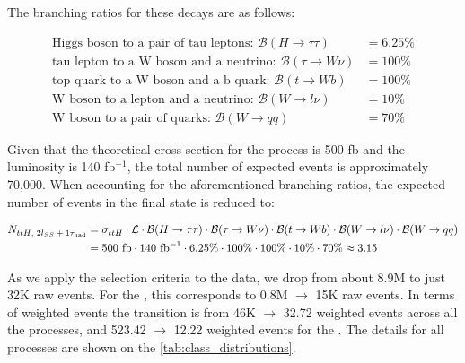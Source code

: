 The branching ratios for these decays are as follows:

\begin{align*}
    \text{Higgs boson to a pair of tau leptons: }\mathcal{B}(H \rightarrow \tau\tau)  & = 6.25\% \\
    \text{tau lepton to a W boson and a neutrino: }\mathcal{B}(\tau \rightarrow W\nu) & = 100\%  \\
    \text{top quark to a W boson and a b quark: }\mathcal{B}(t \rightarrow Wb)        & = 100\%  \\
    \text{W boson to a lepton and a neutrino: }\mathcal{B}(W \rightarrow l\nu)        & = 10\%   \\
    \text{W boson to a pair of quarks: }\mathcal{B}(W \rightarrow qq)                 & = 70\%
\end{align*}

Given that the theoretical cross-section for the \tth process is 500 fb and the luminosity is 140 fb$^{-1}$, the total
number of expected \tth events is approximately 70,000. When accounting for the aforementioned branching ratios, the
expected number of \tth events in the \lss final state is reduced to:

\begin{align*}
    N_{\text{\ensuremath{{t\bar{t}H}}, \ensuremath{2l_{SS}+1\tau_\text{had}}}} & = \sigma_{\text{\ensuremath{{t\bar{t}H}}}} \cdot \mathcal{L} \cdot \mathcal{B}(H \rightarrow \tau\tau) \cdot \mathcal{B}(\tau \rightarrow W\nu) \cdot \mathcal{B}(t \rightarrow Wb) \cdot \mathcal{B}(W \rightarrow l\nu) \cdot \mathcal{B}(W \rightarrow qq) \\
                          & = 500 \text{ fb} \cdot 140 \text{ fb}^{-1} \cdot 6.25\% \cdot 100\% \cdot 100\% \cdot 10\% \cdot 70\% \approx 3.15
\end{align*}



As we apply the selection criteria to the data, we drop from about 8.9M to just 32K raw events. For the \tth, this
corresponds to 0.8M $\rightarrow$ 15K raw events. In terms of weighted events the transition is from 46K $\rightarrow$
32.72 weighted events across all the processes, and 523.42 $\rightarrow$ 12.22 weighted events for the \tth. The details
for all processes are shown on the \autoref{tab:class_distributions}.

